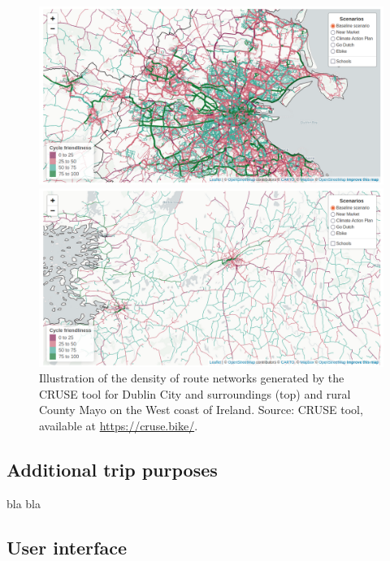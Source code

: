 \documentclass[
  super,
  preprint,
  3p]{elsarticle}
\begin{document}
\begin{figure}

{\centering 

\includegraphics{images/paste-1.png}

\includegraphics{images/paste-3.png}

}

\caption{\label{fig-dublin}Illustration of the density of route networks
generated by the CRUSE tool for Dublin City and surroundings (top) and
rural County Mayo on the West coast of Ireland. Source: CRUSE tool,
available at \url{https://cruse.bike/}.}

\end{figure}

\hypertarget{sec-trip-purposes}{%
\subsection{Additional trip purposes}\label{sec-trip-purposes}}

bla bla

\hypertarget{sec-ui}{%
\subsection{User interface}\label{sec-ui}}
\end{document}
